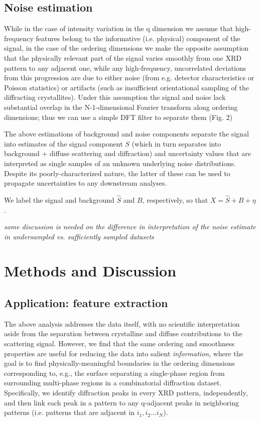 \documentclass[12pt]{iopart}
\begin{document}
\subsection{Noise estimation}
While in the case of intensity variation in the q dimension we assume
that high-frequency features belong to the informative (i.e. physical)
component of the signal, in the case of the ordering dimensions we
make the opposite assumption that the physically relevant part of the
signal varies smoothly from one XRD pattern to any adjacent one, while
any high-frequency, uncorrelated deviations from this progression are
due to either noise (from e.g. detector characteristics or Poisson
statistics) or artifacts (such as insufficient orientational sampling
of the diffracting crystallites). Under this assumption the signal and
noise lack substantial overlap in the N-1-dimensional Fourier transform
along ordering dimensions; thus we can use a simple DFT filter to
separate them (Fig. 2)

The above estimations of background and noise components separate
the signal into estimates of the signal component $S$ (which in turn separates into
background + diffuse scattering and diffraction) and uncertainty values
that are interpreted as single samples of an unknown underlying noise distributions. Despite its poorly-characterized nature, the latter of these can be used to propagate uncertainties to any downstream analyses. 

We label the signal and background $\hat{S}$ and $B$, respectively,
so that $X = \hat{S} + B + \eta$.

\emph{some discussion is needed on the difference in interpretation of the noise estimate in undersampled vs. sufficiently sampled datasets}

\section{Methods and Discussion}
\subsection{Application: feature extraction}
The above analysis addresses the data itself, with no scientific
interpretation aside from the separation between crystalline and diffuse
contributions to the scattering signal. However, we find that the same
ordering and smoothness properties are useful for reducing the data into
salient \emph{information}, where the goal is to find physically-meaningful
boundaries in the ordering dimensions corresponding to, e.g., the
surface separating a single-phase region from surrounding multi-phase
regions in a combinatorial diffraction dataset. Specifically, we 
identify diffraction peaks in every XRD pattern, independently, and then
link each peak in a pattern to any q-adjacent peaks in neighboring patterns (i.e. patterns that are adjacent in $i_1, i_2 ... i_N$). 
\end{document}
